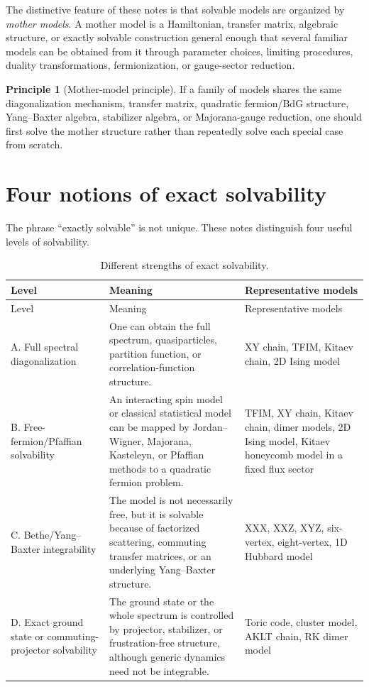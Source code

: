 \documentclass[12pt,openany]{book}
\theoremstyle{definition}
\newtheorem{principle}{Principle}[chapter]
\theoremstyle{plain}
\begin{document}
The distinctive feature of these notes is that solvable models are organized by \emph{mother models}. A mother model is a Hamiltonian, transfer matrix, algebraic structure, or exactly solvable construction general enough that several familiar models can be obtained from it through parameter choices, limiting procedures, duality transformations, fermionization, or gauge-sector reduction.

\begin{principle}[Mother-model principle]
If a family of models shares the same diagonalization mechanism, transfer matrix, quadratic fermion/BdG structure, Yang--Baxter algebra, stabilizer algebra, or Majorana-gauge reduction, one should first solve the mother structure rather than repeatedly solve each special case from scratch.
\end{principle}

\section{Four notions of exact solvability}

The phrase ``exactly solvable'' is not unique. These notes distinguish four useful levels of solvability.

{\small\setlength{\tabcolsep}{3pt}\begin{longtable}{L{0.15\textwidth}L{0.39\textwidth}L{0.31\textwidth}}
\caption{Different strengths of exact solvability.}\label{tab:solvability-levels}\\
\toprule
Level & Meaning & Representative models \\
\midrule
\endfirsthead
\toprule
Level & Meaning & Representative models \\
\midrule
\endhead
A. Full spectral diagonalization & One can obtain the full spectrum, quasiparticles, partition function, or correlation-function structure. & XY chain, TFIM, Kitaev chain, 2D Ising model \\
B. Free-fermion/\newline Pfaffian solvability & An interacting spin model or classical statistical model can be mapped by Jordan--Wigner, Majorana, Kasteleyn, or Pfaffian methods to a quadratic fermion problem. & TFIM, XY chain, Kitaev chain, dimer models, 2D Ising model, Kitaev honeycomb model in a fixed flux sector \\
C. Bethe/Yang--Baxter integrability & The model is not necessarily free, but it is solvable because of factorized scattering, commuting transfer matrices, or an underlying Yang--Baxter structure. & XXX, XXZ, XYZ, six-vertex, eight-vertex, 1D Hubbard model \\
D. Exact ground state or commuting-projector solvability & The ground state or the whole spectrum is controlled by projector, stabilizer, or frustration-free structure, although generic dynamics need not be integrable. & Toric code, cluster model, AKLT chain, RK dimer model \\
\bottomrule
\end{longtable}}
\end{document}
